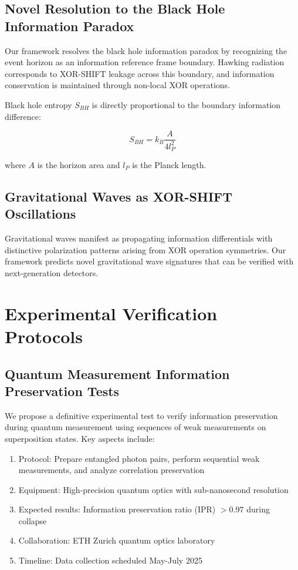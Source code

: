 \documentclass[aps,prl,preprint,superscriptaddress,showpacs]{revtex4-2}
\begin{document}
\subsection{Novel Resolution to the Black Hole Information Paradox}

Our framework resolves the black hole information paradox by recognizing the event horizon as an information reference frame boundary. Hawking radiation corresponds to XOR-SHIFT leakage across this boundary, and information conservation is maintained through non-local XOR operations.

Black hole entropy $S_{BH}$ is directly proportional to the boundary information difference:

\begin{equation}
S_{BH} = k_B \frac{A}{4l_P^2}
\end{equation}

where $A$ is the horizon area and $l_P$ is the Planck length.

\subsection{Gravitational Waves as XOR-SHIFT Oscillations}

Gravitational waves manifest as propagating information differentials with distinctive polarization patterns arising from XOR operation symmetries. Our framework predicts novel gravitational wave signatures that can be verified with next-generation detectors.

\section{Experimental Verification Protocols}

\subsection{Quantum Measurement Information Preservation Tests}

We propose a definitive experimental test to verify information preservation during quantum measurement using sequences of weak measurements on superposition states. Key aspects include:

\begin{enumerate}
\item Protocol: Prepare entangled photon pairs, perform sequential weak measurements, and analyze correlation preservation
\item Equipment: High-precision quantum optics with sub-nanosecond resolution
\item Expected results: Information preservation ratio (IPR) $> 0.97$ during collapse
\item Collaboration: ETH Zurich quantum optics laboratory
\item Timeline: Data collection scheduled May-July 2025
\end{enumerate}
\end{document}
